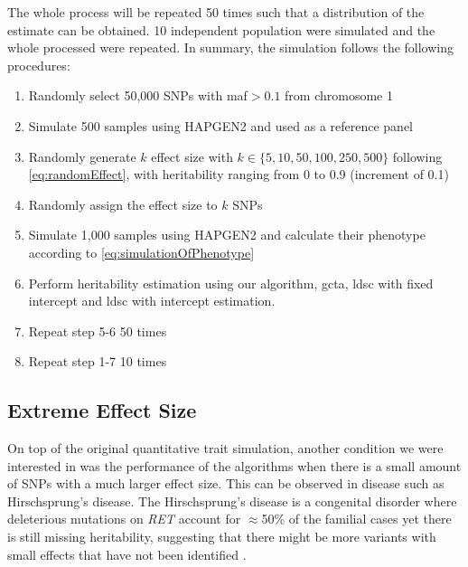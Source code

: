 			The whole process will be repeated 50 times such that a distribution of the estimate can be obtained.
			10 independent population were simulated and the whole processed were repeated.
			In summary, the simulation follows the following procedures:
			\begin{enumerate}
				\item Randomly select 50,000 \glspl{SNP} with \gls{maf}$>0.1$ from chromosome 1
				\item Simulate 500 samples using HAPGEN2 and used as a reference panel
				\item Randomly generate $k$ effect size with $k \in \{5,10,50,100,250,500\}$ following \cref{eq:randomEffect}, with heritability ranging from 0 to 0.9 (increment of 0.1)
				\item Randomly assign the effect size to $k$ \glspl{SNP}
				\item Simulate 1,000 samples using HAPGEN2 and calculate their phenotype according to \cref{eq:simulationOfPhenotype}
				\item Perform heritability estimation using our algorithm, \gls{gcta}, \gls{ldsc} with fixed intercept and \gls{ldsc} with intercept estimation.
				\item Repeat step 5-6 50 times
				\item Repeat step 1-7 10 times
			\end{enumerate}
		
		\subsection{Extreme Effect Size}
		On top of the original quantitative trait simulation, another condition we were interested in was the performance of the algorithms when there is a small amount of \glspl{SNP} with a much larger effect size.
		This can be observed in disease such as Hirschsprung's disease.
		The Hirschsprung's disease is a congenital disorder where deleterious mutations on \textit{RET} account for $\approx$50\% of the familial cases yet there is still missing heritability, suggesting that there might be more variants with small effects that have not been identified \citep{Gui2013}.
		
